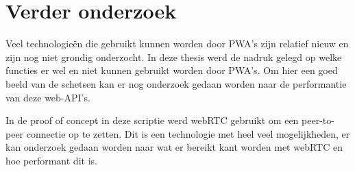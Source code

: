 \section{Verder onderzoek}
	Veel technologieën die gebruikt kunnen worden door PWA's zijn relatief nieuw en zijn nog niet grondig onderzocht.
	In deze thesis werd de nadruk gelegd op welke functies er wel en niet kunnen gebruikt worden door PWA's. Om hier een goed beeld van de schetsen kan er nog onderzoek gedaan worden naar de performantie van deze web-API's.
	
	In de proof of concept in deze scriptie werd webRTC gebruikt om een peer-to-peer connectie op te zetten. Dit is een technologie met heel veel mogelijkheden, er kan onderzoek gedaan worden naar wat er bereikt kant worden met webRTC en hoe performant dit is.